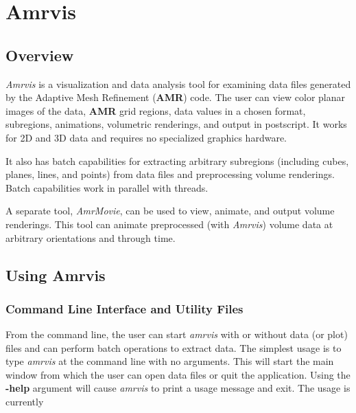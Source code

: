 \section{Amrvis}

\subsection{Overview}

{\em Amrvis} is a visualization and data analysis tool for
examining data files generated by the Adaptive Mesh Refinement
({\bf AMR}) code.  The user can view color planar images of the data,
{\bf AMR} grid regions, data values in a chosen format, subregions, animations,
volumetric renderings, and output in postscript.  It works for 2D and 3D data
and requires no specialized graphics hardware.

It also has batch capabilities for extracting arbitrary subregions
(including cubes, planes, lines, and points) from data files and
preprocessing volume renderings.  Batch capabilities work in parallel
with threads.

A separate tool, {\em AmrMovie}, can be used to view, animate, and output volume
renderings.  This tool can animate preprocessed (with {\em Amrvis}) volume
data at arbitrary orientations and through time.


\subsection{Using Amrvis}

\subsubsection{Command Line Interface and Utility Files}

From the command line, the user can start {\em amrvis} with or without
data (or plot) files and can perform batch operations
to extract data.  The simplest usage is to type {\em amrvis} at the command
line with no arguments.  This will start the main window from which
the user can open data files or quit the application.  Using the {\bf -help}
argument will cause {\em amrvis} to print a usage message and exit.  The usage
is currently

